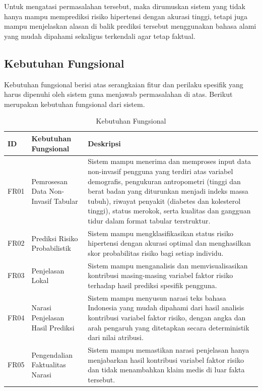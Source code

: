 Untuk mengatasi permasalahan tersebut, maka dirumuskan sistem yang tidak hanya mampu memprediksi risiko hipertensi dengan akurasi tinggi, tetapi juga mampu menjelaskan alasan di balik prediksi tersebut menggunakan bahasa alami yang mudah dipahami sekaligus terkendali agar tetap faktual.

\subsection{Kebutuhan Fungsional}
Kebutuhan fungsional berisi atas serangkaian fitur dan perilaku spesifik yang harus dipenuhi oleh sistem guna menjawab permasalahan di atas. Berikut merupakan kebutuhan fungsional dari sistem.

\begin{table}[H]
    \caption{Kebutuhan Fungsional}
    \label{tab:kebutuhan-fungsional}
    \centering
    \small
    \begin{tabular}{|p{1.5cm}|p{4.5cm}|p{7.5cm}|}
        \hline
        \textbf{ID} & \textbf{Kebutuhan Fungsional} & \textbf{Deskripsi} \\
        \hline
        FR01 & Pemrosesan Data Non-Invasif Tabular & Sistem mampu menerima dan memproses input data non-invasif pengguna yang terdiri atas variabel demografis, pengukuran antropometri (tinggi dan berat badan yang diturunkan menjadi indeks massa tubuh), riwayat penyakit (diabetes dan kolesterol tinggi), status merokok, serta kualitas dan gangguan tidur dalam format tabular terstruktur. \\
        \hline
        FR02 & Prediksi Risiko Probabilistik & Sistem mampu mengklasifikasikan status risiko hipertensi dengan akurasi optimal dan menghasilkan skor probabilitas risiko bagi setiap individu. \\
        \hline
        FR03 & Penjelasan Lokal & Sistem mampu menganalisis dan memvisualisasikan kontribusi masing-masing variabel faktor risiko terhadap hasil prediksi spesifik pengguna. \\
        \hline
        FR04 & Narasi Penjelasan Hasil Prediksi & Sistem mampu menyusun narasi teks bahasa Indonesia yang mudah dipahami dari hasil analisis kontribusi variabel faktor risiko, dengan angka dan arah pengaruh yang ditetapkan secara deterministik dari nilai atribusi. \\
        \hline
        FR05 & Pengendalian Faktualitas Narasi & Sistem mampu memastikan narasi penjelasan hanya menjabarkan hasil kontribusi variabel faktor risiko dan tidak menambahkan klaim medis di luar fakta tersebut. \\
        \hline
    \end{tabular}
\end{table}

